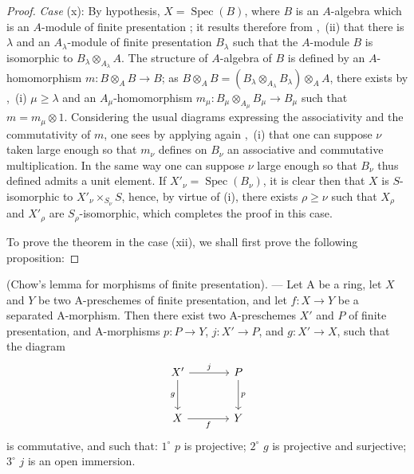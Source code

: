 \begin{proof}
\emph{Case} (x): By hypothesis, $X=\operatorname{Spec}(B)$, where $B$ is an $A$-algebra which is an $A$-module of finite presentation ; it results therefore from ,~(ii) that there is $\lambda$ and an $A_\lambda$-module of finite presentation $B_\lambda$ such that the $A$-module $B$ is isomorphic to $B_\lambda\otimes_{A_\lambda}A$.
The structure of $A$-algebra of $B$ is defined by an $A$-homomorphism $m:B\otimes_A B\to B$; as $B\otimes_A B=(B_\lambda\otimes_{A_\lambda}B_\lambda)\otimes_A A$, there exists by ,~(i) $\mu\geqslant\lambda$ and an $A_\mu$-homomorphism $m_\mu:B_\mu\otimes_{A_\mu}B_\mu\to B_\mu$ such that $m=m_\mu\otimes 1$.
Considering the usual diagrams expressing the associativity and the commutativity of $m$, one sees by applying again ,~(i) that one can suppose $\nu$ taken large enough so that $m_\nu$ defines on $B_\nu$ an associative and commutative multiplication.
In the same way one can suppose $\nu$ large enough so that $B_\nu$ thus defined admits a unit element.
If $X'_\nu=\operatorname{Spec}(B_\nu)$, it is clear then that $X$ is $S$-isomorphic to $X'_\nu\times_{S_\nu}S$, hence, by virtue of (i), there exists $\rho\geqslant\nu$ such that $X_\rho$ and $X'_\rho$ are $S_\rho$-isomorphic, which completes the proof in this case.

To prove the theorem in the case (xii), we shall first prove the following proposition:
\end{proof}

\begin{proposition}[8.10.5.1]
\label{IV.8.10.5.1}
(Chow's lemma for morphisms of finite presentation). --- Let $\mathrm{A}$ be a ring, let $X$ and $Y$ be two $\mathrm{A}$-preschemes of finite presentation, and let $f:X\to Y$ be a separated $\mathrm{A}$-morphism. Then there exist two $\mathrm{A}$-preschemes $X'$ and $P$ of finite presentation, and $\mathrm{A}$-morphisms $p:P\to Y$, $j:X'\to P$, and $g:X'\to X$, such that the diagram
\[
\begin{tikzcd}[column sep=large,row sep=large]
X' \arrow[r,"j"] \arrow[d,"g"'] & P \arrow[d,"p"] \\
X \arrow[r,"f"'] & Y
\end{tikzcd}
\]
is commutative, and such that: $1^\circ$ $p$ is projective; $2^\circ$ $g$ is projective and surjective; $3^\circ$ $j$ is an open immersion.
\end{proposition}

